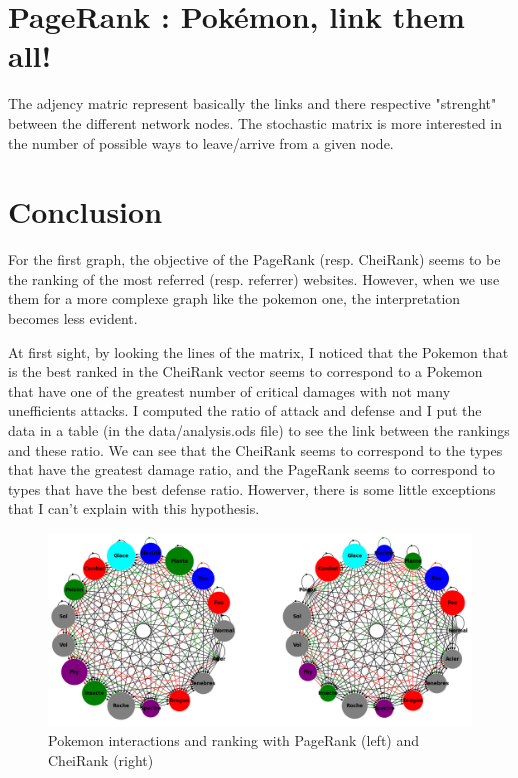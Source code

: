 \documentclass[12pt]{article}
\begin{document}
\section{PageRank : Pokémon, link them all!}

The adjency matric represent basically the links and there respective "strenght" between the different  network nodes. The stochastic matrix is more interested in the number of possible ways to leave/arrive from a given node.

\section{Conclusion}

For the first graph, the objective of the PageRank (resp. CheiRank) seems to be the ranking of the most referred (resp. referrer) websites. However, when we use them for a more complexe graph like the pokemon one, the interpretation becomes less evident.

At first sight, by looking the lines of the matrix, I noticed that the Pokemon that is the best ranked in the CheiRank vector seems to correspond to a Pokemon that have one of the greatest number of critical damages with not many unefficients attacks. I computed the ratio of attack and defense and I put the data in a table (in the data/analysis.ods file) to see the link between the rankings and these ratio. We can see that the CheiRank seems to correspond to the types that have the greatest damage ratio, and the PageRank seems to correspond to types that have the best defense ratio. Howerver, there is some little exceptions that I can't explain with this hypothesis.

\begin{figure}[ht]
    \centering
    \includegraphics[width=\textwidth]{images/pokemon.png}
    \caption{Pokemon interactions and ranking with PageRank (left) and CheiRank (right)}
    \label{fig:pokemons}
\end{figure}
\end{document}
